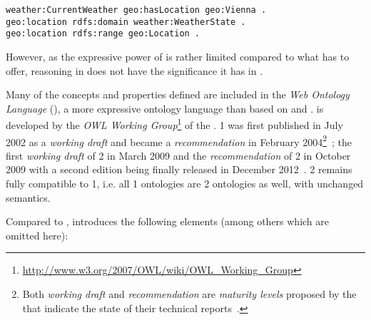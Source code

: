 \begin{verbatim}
weather:CurrentWeather geo:hasLocation geo:Vienna .
geo:location rdfs:domain weather:WeatherState .
geo:location rdfs:range geo:Location .
\end{verbatim}
However, as the expressive power of  is rather limited compared to what  has to offer, reasoning in  does not have the significance it has in .

Many of the concepts and properties defined are included in the \emph{Web Ontology Language} (), a more expressive ontology language than  based on  and .  is developed by the \emph{OWL Working Group}\footnote{\href{http://www.w3.org/2007/OWL/wiki/OWL\_Working\_Group}{http://www.w3.org/2007/OWL/wiki/OWL\_Working\_Group}} of the .  1 was first published in July 2002 as a \emph{working draft} and became a  \emph{recommendation} in February 2004\footnote{Both \emph{working draft} and \emph{recommendation} are \emph{maturity levels} proposed by the  that indicate the state of their technical reports~\cite{w3c-process}.}~\cite{OWL1}; the first \emph{working draft} of  2 in March 2009 and the  \emph{recommendation} of  2 in October 2009 with a second edition being finally released in December 2012~\cite{OWL}.
 2 remains fully compatible to  1, i.e. all  1 ontologies are  2 ontologies as well, with unchanged semantics.

Compared to ,  introduces the following elements (among others which are omitted here):


